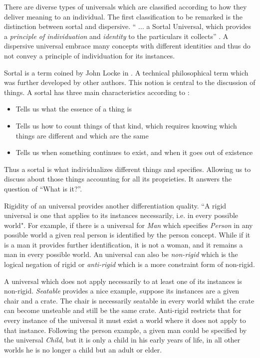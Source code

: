 There are diverse types of universals which are classified according to how they deliver meaning to an individual. The first classification to be remarked is the distinction between sortal and dispersive. `` ... a Sortal Universal, which provides a \textit{principle of individuation} and \textit{identity} to the particulars it collects'' \citep{guizzardi_ontological_2005}. A dispersive universal embrace many concepts with different identities and thus do not convey a principle of individuation for its instances.

Sortal is a term coined by John Locke in \cite{locke1841essay}. A technical philosophical term which was further developed by other authors. This notion is central to the discussion of things. A sortal has three main characteristics according to \cite{sep-sortals}:

\begin{itemize}
    \item Tells us what the essence of a thing is
    \item Tells us how to count things of that kind, which requires knowing which things are different and which are the same
    \item Tells us when something continues to exist, and when it goes out of existence
\end{itemize}

Thus a sortal is what individualizes different things and specifies. Allowing us to discuss about those things accounting for all its proprieties. It answers the question of ``What is it?''.

Rigidity of an universal provides another differentiation quality. ``A rigid universal is one that applies to its instances necessarily, i.e. in every possible world"\citep{guizzardi_ontological_2005}. For example, if there is a universal for \textit{Man} which specifies \textit{Person} in any possible world a given real person is identified by the person concept. While if it is a man it provides further identification, it is not a woman, and it remains a man in every possible world. An universal can also be \textit{non-rigid} which is the logical negation of rigid or \textit{anti-rigid} which is a more constraint form of non-rigid.

A universal which does not apply necessarily to at least one of its instances is non-rigid. \textit{Seatable} provides a nice example, suppose its instances are a given chair and a crate. The chair is necessarily seatable in every world whilst the crate can become unsteable and still be the same crate. Anti-rigid restricts that for every instance of the universal it must exist a world where it does not apply to that instance. Following the person example, a given man could be specified by the universal \textit{Child}, but it is only a child in his early years of life, in all other worlds he is no longer a child but an adult or elder.

